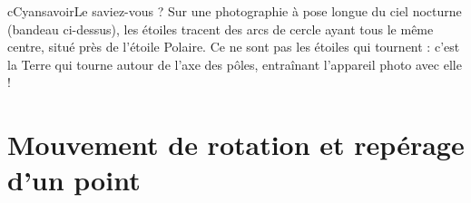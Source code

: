 \documentclass[11pt,a4paper]{article}
\begin{document}
\begin{encart}{cCyan}{savoir}{Le saviez-vous ?}
Sur une photographie à pose longue du ciel nocturne (bandeau ci-dessus), les étoiles tracent des arcs de cercle ayant tous le même centre, situé près de l’étoile Polaire. Ce ne sont pas les étoiles qui tournent : c’est la Terre qui tourne autour de l’axe des pôles, entraînant l’appareil photo avec elle !
\end{encart}

\newpage
\section{Mouvement de rotation et repérage d’un point}
\end{document}
